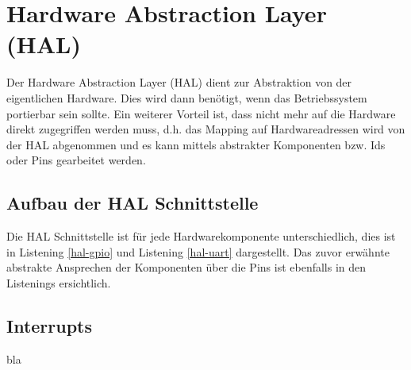 \section{Hardware Abstraction Layer (HAL)}
Der Hardware Abstraction Layer (HAL) dient zur Abstraktion von der eigentlichen Hardware. Dies wird dann benötigt, wenn das Betriebssystem portierbar sein sollte. Ein weiterer Vorteil ist, dass nicht mehr auf die Hardware direkt zugegriffen werden muss, d.h. das Mapping auf Hardwareadressen wird von der HAL abgenommen und es kann mittels abstrakter Komponenten bzw. Ids oder Pins gearbeitet werden. 

\subsection{Aufbau der HAL Schnittstelle}
Die HAL Schnittstelle ist für jede Hardwarekomponente unterschiedlich, dies ist in Listening \ref{hal-gpio} und Listening \ref{hal-uart} dargestellt. Das zuvor erwähnte abstrakte Ansprechen der Komponenten über die Pins ist ebenfalls in den Listenings ersichtlich.





\subsection{Interrupts}
bla
\pagebreak 